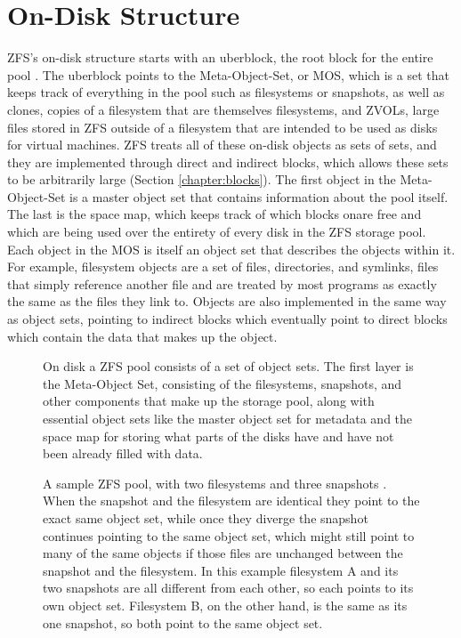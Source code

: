 \section{On-Disk Structure}
ZFS's on-disk structure starts with an uberblock, the root block for the entire pool 
\cite{ahrens_read_write,mckusick_zfs_2015_presentation}.
The uberblock points to the Meta-Object-Set, or MOS, which is a set that keeps track of everything in the pool such as
filesystems or snapshots, as well as clones, copies of a filesystem that are themselves filesystems, 
and ZVOLs, large files stored in ZFS outside of a filesystem that are intended to be used as disks for virtual machines.
ZFS treats all of these on-disk objects as sets of sets, and they are implemented through direct and indirect blocks,
which allows these sets to be arbitrarily large (Section \ref{chapter:blocks}).
The first object in the Meta-Object-Set is a master object set that contains information about the pool itself.
The last is the space map, which keeps track of which blocks onare free and which are being used over the entirety of
every disk in  the ZFS storage pool.
Each object in the MOS is itself an object set that describes the objects within it.
For example, filesystem objects are a set of files, directories, and symlinks, files that simply reference another file and are
treated by most programs as exactly the same as the files they link to.
Objects are also implemented in the same way as object sets, pointing to indirect blocks which eventually point to direct blocks which 
contain the data that makes up the object.

\begin{figure}[H]
    \centering
    \resizebox{!}{0.2\textheight}{}
    \caption{On disk a ZFS pool consists of a set of object sets\cite{mckusick_zfs_2015_presentation}.
    The first layer is the Meta-Object Set, consisting of the filesystems, snapshots, and other components
    that make up the storage pool, along with essential object sets like 
    the master object set for metadata and the space map for storing what parts of the disks have
    and have not been already filled with data.}
    \label{fig:ZFSOnDisk}
\end{figure}

\begin{figure}[H]
    \centering
    \resizebox{!}{0.2\textheight}{}
    \caption{A sample ZFS pool, with two filesystems and three snapshots \cite{mckusick_zfs_2015_presentation}.
        When the snapshot and the filesystem are identical they point to the exact same object set,
        while once they diverge the snapshot continues pointing to the same object set, which might still point to many of the same
        objects if those files are unchanged between the snapshot and the filesystem.
        In this example filesystem A and its two snapshots are all different from each other, so each points to its own object set.
        Filesystem B, on the other hand, is the same as its one snapshot, so both point to the same object set.
    }
\label{fig:ZFSOnDiskExample}
\end{figure}


